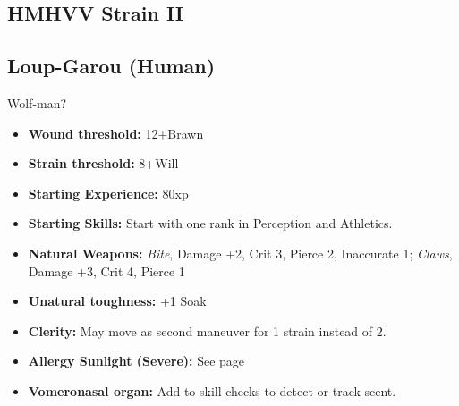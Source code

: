 \documentclass{book}
\begin{document}
\begin{multicols}{2}
	\subsection{HMHVV Strain II}

	\subsection{Loup-Garou (Human)}
	Wolf-man?
	
	\begin{itemize}
		\item \textbf{Wound threshold:} 12+Brawn
		\item \textbf{Strain threshold:} 8+Will
		\item \textbf{Starting Experience:} 80xp
		\item \textbf{Starting Skills:} Start with one rank in Perception and Athletics.
		\item \textbf{Natural Weapons:} \textit{Bite}, Damage +2, Crit 3, Pierce 2, Inaccurate 1; \textit{Claws}, Damage +3, Crit 4, Pierce 1
		\item \textbf{Unatural toughness:} +1 Soak
		\item \textbf{Clerity:} May move as second maneuver for 1 strain instead of 2.
		\item \textbf{Allergy Sunlight (Severe):} See page \pageref{allergysunlight}
		\item \textbf{Vomeronasal organ:} Add \BoostDie \BoostDie to skill checks to detect or track scent.
	\end{itemize}
	
%	
	
\end{multicols}
\end{document}
